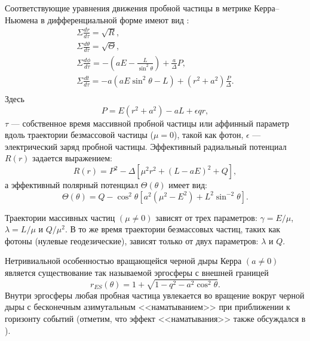 Соответствующие уравнения движения пробной частицы в метрике Керра–Ньюмена в дифференциальной форме имеют вид \cite{carterGlobalStructureKerr1968,thorne2000gravitation,chandrasekhar1998mathematical}:
\begin{subequations}
    \label{eq:EoM}
    \begin{gather}
	\Sigma \frac{dr}{d\tau}=\sqrt{R}, \label{dr} \\
	\Sigma \frac{d\theta}{d\tau} = \sqrt{\Theta}, \label{dtheta}\\
	\Sigma \frac{d\phi}{d\tau}=-(aE-\frac{L}{\sin^2\theta}) +\frac{a}{\Delta}P, \label{dvarphi}\\
	\Sigma \frac{dt}{d\tau} = -a(aE\sin^2\theta-L)+(r^2+a^2)\frac{P}{\Delta}. \label{dt}\\
    \end{gather}
\end{subequations}
Здесь
\begin{equation}
	P=E(r^2+a^2)-a L+\epsilon qr, \label{P}
\end{equation}
\(\tau\) — собственное время массивной пробной частицы или аффинный параметр вдоль траектории безмассовой частицы (\(\mu=0\)), такой как фотон, \(\epsilon\) — электрический заряд пробной частицы. Эффективный радиальный потенциал \(R(r)\) задается выражением:
\begin{equation}
	R(r) = P^2-\Delta[\mu^2r^2+(L-aE)^2+Q], \label{Rr}
\end{equation}
а эффективный полярный потенциал \(\Theta(\theta)\) имеет вид:
\begin{equation}
	\Theta(\theta) = Q-\cos^2\theta[a^2(\mu^2-E^2)+L^2\sin^{-2}\theta]. \label{Vtheta}
\end{equation}

Траектории массивных частиц \((\mu\neq0)\) зависят от трех параметров: \(\gamma=E/\mu\), \(\lambda=L/\mu\) и \(Q/\mu^2\). В то же время траектории безмассовых частиц, таких как фотоны (нулевые геодезические), зависят только от двух параметров: \(\lambda\) и \(Q\).

Нетривиальной особенностью вращающейся черной дыры Керра \((a\neq0)\) является существование так называемой эргосферы \cite{thorne2000gravitation,chandrasekhar1998mathematical,waldGeneralRelativity1984} с внешней границей
\begin{equation}\label{ES}
	r_{ES}(\theta) =1+\sqrt{1-q^2-a^2\cos^2\theta}.
\end{equation}
Внутри эргосферы любая пробная частица увлекается во вращение вокруг черной дыры с бесконечным азимутальным <<наматыванием>> при приближении к горизонту событий (отметим, что эффект <<наматывания>> также обсуждался в \cite{dyson2023kerr, kling2019examining}).


